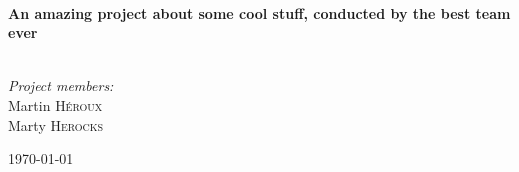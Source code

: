\begin{titlepage}
\begin{center}





\HRule \\[1.5cm]

{ \huge \bfseries An amazing project about some cool stuff, conducted by the best team ever\\[0.4cm] }

\HRule \\[1.5cm]

\large
\emph{Project members:}\\
\vspace{1cm}
Martin \textsc{H\'{e}roux}\\
Marty \textsc{Herocks}\\


\vfill

{\large \today}

\end{center}
\end{titlepage}